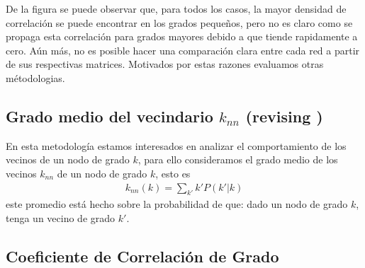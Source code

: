 De la figura se puede observar que, para todos los casos, la mayor densidad de correlaci\'on se puede encontrar en los 
grados peque\~nos, pero no es claro como se propaga esta correlaci\'on para grados mayores debido a que tiende rapidamente 
a cero. A\'un m\'as, no es posible hacer una comparaci\'on clara entre cada red a partir de sus respectivas matrices. Motivados por estas razones evaluamos otras m\'etodologias.

\subsection{Grado medio del vecindario $k_{nn}$ (revising \citet{barabasi})}
En esta metodolog\'ia estamos interesados en analizar el comportamiento de los vecinos de un nodo de grado $k$, para
ello consideramos el grado medio de los vecinos $k_{nn}$ de un nodo de grado $k$, esto es
\begin{align}
    k_{nn}(k) = \sum_{k'} k' P(k'|k)
\end{align}
este promedio est\'a hecho sobre la probabilidad de que: dado un nodo de grado $k$, tenga un vecino de grado $k'$.


\subsection{Coeficiente de Correlaci\'on de Grado}
